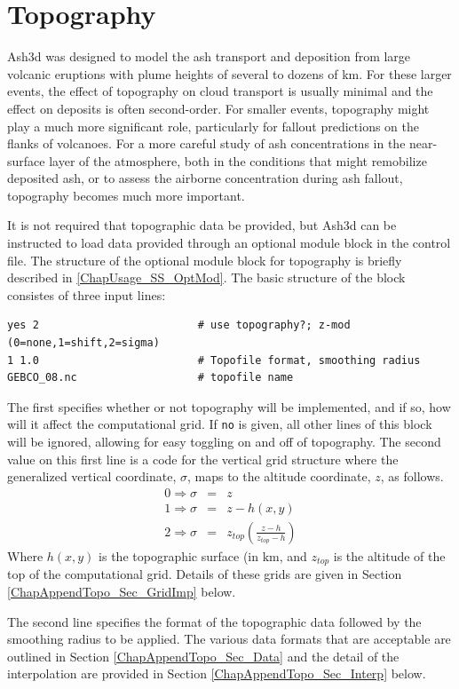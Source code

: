 \chapter{Topography}\label{ChapAppendTopo}
Ash3d was designed to model the ash transport and deposition from large volcanic
eruptions with plume heights of several to dozens of km. For these larger
events, the effect of topography on cloud transport is usually minimal
and the effect on deposits is often second-order. For smaller events,
topography might play a much more significant role, particularly for 
fallout predictions on the flanks of volcanoes. For a more careful
study of ash concentrations in the near-surface layer of the atmosphere,
both in the conditions that might remobilize deposited ash, or to
assess the airborne concentration during ash fallout, topography
becomes much more important.

It is not required that topographic data be provided, but Ash3d can
be instructed to load data provided through an optional module block
in the control file. The structure of the optional module block for
topography is briefly described in \ref{ChapUsage_SS_OptMod}. The basic
structure of the block consistes of three input lines:
\small
\begin{verbatim}
yes 2                         # use topography?; z-mod (0=none,1=shift,2=sigma)
1 1.0                         # Topofile format, smoothing radius
GEBCO_08.nc                   # topofile name
\end{verbatim}
\normalsize
The first specifies whether or not topography will be implemented, and if
so, how will it affect the computational grid. If \texttt{no} is
given, all other lines of this block will be ignored, allowing for
easy toggling on and off of topography. The second value on this first line is
a code for the vertical grid structure where the generalized vertical coordinate,
$\sigma$, maps to the altitude coordinate, $z$, as follows.
\begin{eqnarray*}
0 \Rightarrow  \sigma &=& z \\
1 \Rightarrow  \sigma &=& z - h(x,y) \\
2 \Rightarrow  \sigma &=& z_{top} \left( \frac{z-h}{z_{top} - h} \right)
\end{eqnarray*}
Where $h(x,y)$ is the topographic surface (in $\mathrm{km}$, and $z_{top}$
is the altitude of the top of the computational grid.
Details of these grids are given in Section \ref{ChapAppendTopo_Sec_GridImp} below.

The second line specifies the format of the topographic data followed by
the smoothing radius to be applied. The various data formats that are acceptable
are outlined in Section \ref{ChapAppendTopo_Sec_Data} and the detail of the
interpolation are provided in Section \ref{ChapAppendTopo_Sec_Interp} below.

